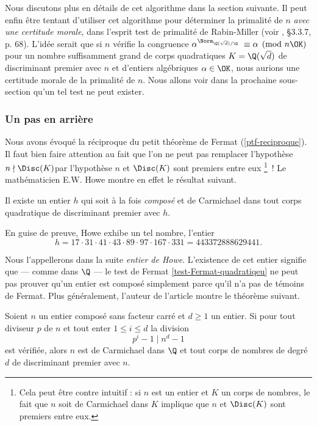 Nous discutons plus en détails de cet algorithme dans la section suivante. Il peut enfin être tentant d'utiliser cet algorithme pour déterminer la primalité de $n$ \emph{avec une certitude morale}, dans l'esprit test de primalité de Rabin-Miller (voir \cite{Demazure}, §3.3.7, p. 68). L'idée serait que si $n$ vérifie la congruence $\alpha^{\Norm_{\Q(\sqrt{d})/\Q}} \equiv \alpha \pmod{n\OK}$ pour un nombre suffisamment grand de corps quadratiques $K = \Q(\sqrt{d})$ de discriminant premier avec $n$ et d'entiers algébriques $\alpha \in \OK$, nous aurions une certitude morale de la primalité de $n$. Nous allons voir dans la prochaine sous-section qu'un tel test ne peut exister.

\subsubsection{Un pas en arrière}

Nous avons évoqué la réciproque du petit théorème de Fermat (\ref{ptf-reciproque}). Il faut bien faire attention au fait que l'on ne peut pas remplacer l'hypothèse \og $n \nmid \Disc(K)$\fg par l'hypothèse \og $n$ et $\Disc(K)$ sont premiers entre eux \fg \footnote{Cela peut être contre intuitif : si $n$ est un entier et $K$ un corps de nombres, le fait que $n$ soit de Carmichael dans $K$ implique que $n$ et $\Disc(K)$ sont premiers entre eux.}~! Le mathématicien E.W. Howe montre en effet le résultat suivant.

\begin{theoreme}[Howe, 200]
	Il existe un entier $h$ qui soit à la fois \emph{composé} et de Carmichael dans tout corps quadratique de discriminant premier avec $h$.
\end{theoreme}

En guise de preuve, Howe exhibe un tel nombre, l'entier 
	\begin{equation}\label{Howe}
		h = 17 \cdot 31 \cdot 41 \cdot 43 \cdot 89 \cdot 97 \cdot 167 \cdot 331 = 443372888629441.
	\end{equation}

Nous l'appellerons dans la suite \emph{entier de Howe}. L'existence de cet entier signifie que — comme dans $\Q$ — le test de Fermat \ref{test-Fermat-quadratiqeu} ne peut pas prouver qu'un entier est composé simplement parce qu'il n'a pas de témoins de Fermat. Plus généralement, l'auteur de l'article montre le théorème suivant.

\begin{theoreme}\label{theoreme-2.7}
	Soient $n$ un entier composé sans facteur carré et $d\geq 1$ un entier. Si pour tout diviseur $p$ de $n$ et tout enter $1\leq i \leq d$ la division $$p^i - 1\mid n^d - 1$$ est vérifiée, alors $n$ est de Carmichael dans $\Q$ et tout corps de nombres de degré $d$ de discriminant premier avec $n$.
\end{theoreme}

